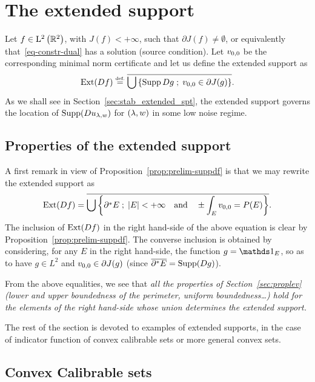 
\section{The extended support}\label{sec:extended}

Let $f\in \mathrm{L}^2\left(\mathbb{R}^2\right)$, with $J(f)<+\infty$, such that $\partial J(f)\neq \emptyset$, or equivalently that~\eqref{eq-constr-dual} has a solution (source condition). 
Let $v_{0,0}$ be the corresponding minimal norm certificate and let us define the extended support as
\begin{equation*}
  \operatorname{Ext}(Df) \stackrel{\mbox{\upshape\tiny def.}}{=} \overline{\bigcup\left\{   \operatorname{Supp} Dg \;;\; v_{0,0}\in \partial J(g) \right\}}.
\end{equation*}
As we shall see in Section~\ref{sec:stab_extended_spt}, the extended support governs the location of $\operatorname{Supp} (Du_{\lambda,w})$ for $(\lambda,w)$ in some low noise regime.


\subsection{Properties of the extended support}
A first remark in view of Proposition~\ref{prop:prelim-suppdf} is that we may rewrite the extended support as 
\begin{equation}\label{eq:extdfperim}
  \operatorname{Ext}(Df) = \overline{\bigcup\left\{ \partial^*E \;;\; \left| E \right|<+\infty \quad \text{and} \quad  \pm\int_E v_{0,0} =P(E) \right\}}.
\end{equation}
The inclusion of $\operatorname{Ext}(Df)$ in the right hand-side of the above equation is clear by Proposition~\ref{prop:prelim-suppdf}. The converse inclusion is obtained by considering, for any $E$ in the right hand-side, the function $g=\bun{E}$, so as to have $g\in L^2$ and $v_{0,0}\in \partial J(g)$ (since $\overline{\partial^*E}=\operatorname{Supp}(Dg)$).

From the above equalities, we see that \textit{all the properties of Section~\ref{sec:proplev} (lower and upper boundedness of the perimeter, uniform boundedness\ldots) hold for the elements of the right hand-side whose union determines the extended support.}





The rest of the section is devoted to examples of extended supports, in the case of indicator function of convex calibrable sets or more general convex sets.

\subsection{Convex Calibrable sets}\label{sec:ext_calib}

